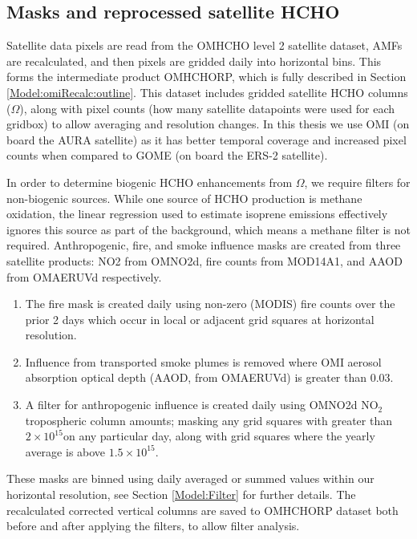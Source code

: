     
  
  \subsection{Masks and reprocessed satellite HCHO}
    
    Satellite data pixels are read from the OMHCHO level 2 satellite dataset, AMFs are recalculated, and then pixels are gridded daily into \highhr horizontal bins. 
    This forms the intermediate product OMHCHORP, which is fully described in Section \ref{Model:omiRecalc:outline}.
    This dataset includes gridded satellite HCHO columns ($\Omega$), along with pixel counts (how many satellite datapoints were used for each gridbox) to allow averaging and resolution changes.
    In this thesis we use OMI (on board the AURA satellite) as it has better temporal coverage and increased pixel counts when compared to GOME (on board the ERS-2 satellite).
    
    In order to determine biogenic HCHO enhancements from $\Omega$, we require filters for non-biogenic sources.
    While one source of HCHO production is methane oxidation, the linear regression used to estimate isoprene emissions effectively ignores this source as part of the background, which means a methane filter is not required.
    Anthropogenic, fire, and smoke influence masks are created from three satellite products: NO2 from OMNO2d, fire counts from MOD14A1, and AAOD from OMAERUVd respectively.
    \begin{enumerate}
      \item 
      The fire mask is created daily using non-zero (MODIS) fire counts over the prior 2 days which occur in local or adjacent grid squares at \highhr horizontal resolution.
      \item 
      Influence from transported smoke plumes is removed where OMI aerosol absorption optical depth (AAOD, from OMAERUVd) is greater than 0.03.
      \item 
      A filter for anthropogenic influence is created daily using OMNO2d NO$_2$ tropospheric column amounts; masking any grid squares with greater than $2\times 10^{15}$\moleccm on any particular day, along with grid squares where the yearly average is above $1.5 \times 10^{15}$\moleccm.
    \end{enumerate}
    These masks are binned using daily averaged or summed values within our \highhr horizontal resolution, see Section \ref{Model:Filter} for further details.
    The recalculated corrected vertical columns are saved to OMHCHORP dataset both before and after applying the filters, to allow filter analysis.
    
